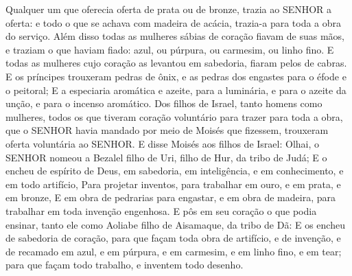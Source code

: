 {Qualquer um que oferecia oferta de prata ou de bronze, trazia ao SENHOR a oferta: e todo o que se achava com madeira de acácia, trazia-a para toda a obra do serviço.
Além disso todas as mulheres sábias de coração fiavam de suas mãos, e traziam o que haviam fiado: azul, ou púrpura, ou carmesim, ou linho fino.
E todas as mulheres cujo coração as levantou em sabedoria, fiaram pelos de cabras.
E os príncipes trouxeram pedras de ônix, e as pedras dos engastes para o éfode e o peitoral;
E a especiaria aromática e azeite, para a luminária, e para o azeite da unção, e para o incenso aromático.
Dos filhos de Israel, tanto homens como mulheres, todos os que tiveram coração voluntário para trazer para toda a obra, que o SENHOR havia mandado por meio de Moisés que fizessem, trouxeram oferta voluntária ao SENHOR.
E disse Moisés aos filhos de Israel: Olhai, o SENHOR nomeou a Bezalel filho de Uri, filho de Hur, da tribo de Judá;
E o encheu de espírito de Deus, em sabedoria, em inteligência, e em conhecimento, e em todo artifício,
Para projetar inventos, para trabalhar em ouro, e em prata, e em bronze,
E em obra de pedrarias para engastar, e em obra de madeira, para trabalhar em toda invenção engenhosa.
E pôs em seu coração o que podia ensinar, tanto ele como Aoliabe filho de Aisamaque, da tribo de Dã:
E os encheu de sabedoria de coração, para que façam toda obra de artifício, e de invenção, e de recamado em azul, e em púrpura, e em carmesim, e em linho fino, e em tear; para que façam todo trabalho, e inventem todo desenho.

}
